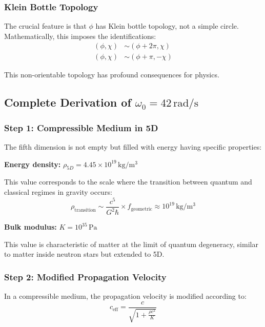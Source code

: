 \documentclass[12pt,a4paper]{article}
\begin{document}
\subsubsection{Klein Bottle Topology}

The crucial feature is that $\phi$ has Klein bottle topology, not a simple circle. Mathematically, this imposes the identifications:
\begin{align}
(\phi, \chi) &\sim (\phi + 2\pi, \chi) \\
(\phi, \chi) &\sim (\phi + \pi, -\chi)
\end{align}

This non-orientable topology has profound consequences for physics.

\subsection{Complete Derivation of $\omega_0 = 42\,\mathrm{rad/s}$}
\label{sec:derivation_omega}

\subsubsection{Step 1: Compressible Medium in 5D}

The fifth dimension is not empty but filled with energy having specific properties:

\textbf{Energy density:} $\rho_{5D} = 4.45 \times 10^{19}\,\mathrm{kg/m^3}$

This value corresponds to the scale where the transition between quantum and classical regimes in gravity occurs:
\begin{equation}
\rho_\mathrm{transition} \sim \frac{c^5}{G^2 \hbar} \times f_\mathrm{geometric} \approx 10^{19}\,\mathrm{kg/m^3}
\end{equation}

\textbf{Bulk modulus:} $K = 10^{35}\,\mathrm{Pa}$

This value is characteristic of matter at the limit of quantum degeneracy, similar to matter inside neutron stars but extended to 5D.

\subsubsection{Step 2: Modified Propagation Velocity}

In a compressible medium, the propagation velocity is modified according to:
\begin{equation}
c_\mathrm{eff} = \frac{c}{\sqrt{1 + \frac{\rho c^2}{K}}}
\end{equation}
\end{document}
